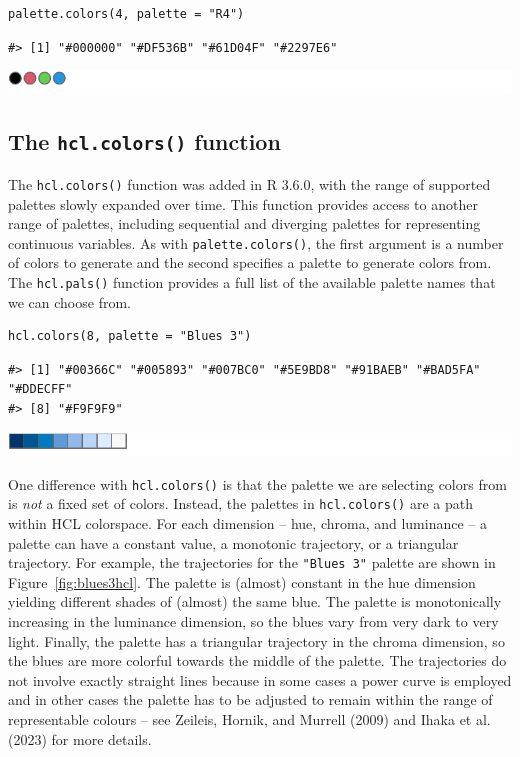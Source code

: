 \begin{verbatim}
palette.colors(4, palette = "R4")
\end{verbatim}

\begin{verbatim}
#> [1] "#000000" "#DF536B" "#61D04F" "#2297E6"
\end{verbatim}

\includegraphics[width=1\linewidth]{color_files/figure-latex/unnamed-chunk-7-1}

\hypertarget{the-hcl.colors-function}{%
\subsection{\texorpdfstring{The \texttt{hcl.colors()} function}{The hcl.colors() function}}\label{the-hcl.colors-function}}

The \texttt{hcl.colors()} function was added in R 3.6.0, with the range
of supported palettes slowly expanded over time.
This function provides access to another range of palettes,
including sequential and diverging palettes
for representing continuous variables.
As with \texttt{palette.colors()}, the first
argument is a number of colors to generate and the second
specifies a palette to generate colors from.
The \texttt{hcl.pals()} function provides a full list of the
available palette names that we can choose from.

\begin{verbatim}
hcl.colors(8, palette = "Blues 3")
\end{verbatim}

\begin{verbatim}
#> [1] "#00366C" "#005893" "#007BC0" "#5E9BD8" "#91BAEB" "#BAD5FA" "#DDECFF"
#> [8] "#F9F9F9"
\end{verbatim}

\includegraphics[width=1\linewidth]{color_files/figure-latex/Blues3-1}

One difference with \texttt{hcl.colors()} is that the palette we are
selecting colors from is \emph{not} a fixed set of colors. Instead,
the palettes in \texttt{hcl.colors()} are a path within HCL colorspace. For each
dimension -- hue, chroma, and luminance -- a palette can have a constant
value, a monotonic trajectory, or a triangular trajectory. For
example, the trajectories for the \texttt{"Blues\ 3"} palette are shown in
Figure~\ref{fig:blues3hcl}. The palette is (almost) constant in the hue
dimension yielding different shades of (almost) the same blue.
The palette is monotonically increasing in the luminance dimension, so
the blues vary from very dark to very light. Finally, the palette has a
triangular trajectory in the chroma dimension, so the blues are more
colorful towards the middle of the palette.
The trajectories do not involve exactly straight lines
because in some cases a power curve is employed and in other cases
the palette has to be adjusted to remain within the range of
representable colours -- see Zeileis, Hornik, and Murrell (2009) and Ihaka et al. (2023)
for more details.

